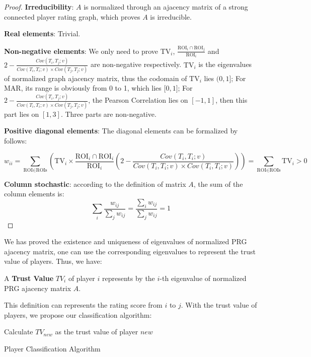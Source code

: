   \begin{proof}
  \textbf{Irreducibility}: $A$ is normalized through an ajacency matrix of a strong connected player
  rating graph, which proves $A$ is irreducible.

  \textbf{Real elements}: Trivial.
  
  \textbf{Non-negative elements}: We only need to prove $\text{TV}_i$, 
    $\frac{\text{ROI}_i\cap\text{ROI}_j}{\text{ROI}_i}$ and 
    $2-\frac{Cov(T_i, T_j; v)}{Cov(T_i, T_i; v)\times Cov(T_j, T_j; v)}$ are non-negative 
    respectively. $\text{TV}_i$ is the eigenvalues of normalized graph ajacency matrix, 
    thus the codomain of $\text{TV}_i$ lies $(0, 1\rbrack$; For MAR, its range is obviously from 0 to 1,
    which lies $\lbrack 0, 1 \rbrack$; For $2-\frac{Cov(T_i, T_j; v)}{Cov(T_i, T_i; v)\times Cov(T_j, T_j; v)}$,
    the Pearson Correlation lies on $[-1, 1]$, then this part lies on $[1, 3]$.
    Three parts are non-negative.
  
  \textbf{Positive diagonal elements}: The diagonal elements can be formalized by follows:

  \[
  w_{ii} = 
  \sum_{\text{ROI}\in\text{ROIs}}{\left(
    \text{TV}_i \times
    \frac{\text{ROI}_i\cap\text{ROI}_i}{\text{ROI}_i}
    \left( 2-\frac{Cov(T_i, T_i; v)}
        {Cov(T_i, T_i; v)\times Cov(T_i, T_i; v)} \right)\right)
  } = \sum_{\text{ROI}\in\text{ROIs}}{\text{TV}_i} > 0
  \]
  
  \textbf{Column stochastic}: according to the definition of matrix $A$, the sum of the column
  elements is:
  \[
    \sum_{i}{\frac{w_{ij}}{\sum_{j}{w_{ij}}}} 
    = \frac{\sum_{i}{w_{ij}}}{\sum_{j}{w_{ij}}} = 1
  \]
  \end{proof}

  We has proved the existence and uniqueness of eigenvalues of normalized PRG ajacency matrix, 
  one can use the corresponding eigenvalues to represent the trust value of players. Thus, we have:

  \begin{definition}
  A \textbf{Trust Value} $TV_i$ of player $i$ represents by the $i$-th eigenvalue of normalized PRG ajacency matrix $A$.
  \end{definition}

  This definition can represents the rating score from $i$ to $j$. With the trust value of players,
  we propose our classification algorithm:

  \begin{algorithm}[H]
  \SetAlgoLined
  Calculate $TV_{new}$ as the trust value of player $new$ \;
  \caption{Player Classification Algorithm}
  \end{algorithm}

